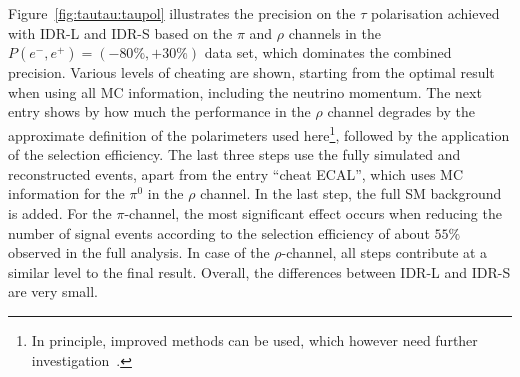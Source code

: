 Figure~\ref{fig:tautau:taupol} illustrates the precision on the $\tau$ polarisation achieved with IDR-L and IDR-S  based on the $\pi$ and $\rho$ channels in the $P(e^-,e^+)=(-80\%,+30\%)$ data set, which dominates the combined precision. Various
levels of cheating are shown, starting from the optimal result when using all MC information, including the neutrino momentum. The next entry shows by how much the performance in the $\rho$ channel degrades by the approximate definition of the polarimeters used here\footnote{In principle, improved methods can be used, which however need further investigation~\cite{ILDNote:tautau}.}, followed by the application of the selection efficiency. The last three steps use the fully simulated and reconstructed events, apart from the entry ``cheat ECAL'', which uses MC information for the $\pi^0$ in the $\rho$ channel. In the last step, the full SM background is added. For the $\pi$-channel, the most significant effect occurs when reducing the number of signal events according to the selection efficiency of about $55\%$ observed in the full analysis. In case of the $\rho$-channel, all steps contribute at a similar level to the final result. Overall, the differences between IDR-L and IDR-S are very small. %


